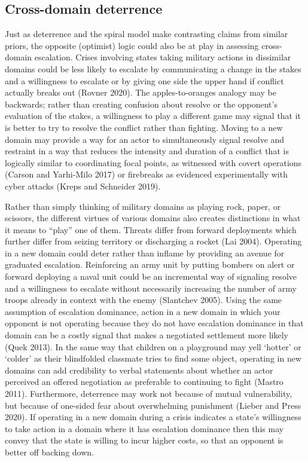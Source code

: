 \documentclass[
]{article}
\begin{document}
\hypertarget{cross-domain-deterrence}{%
\subsection{Cross-domain deterrence}\label{cross-domain-deterrence}}

Just as deterrence and the spiral model make contrasting claims from similar priors, the opposite (optimist) logic could also be at play in assessing cross-domain escalation. Crises involving states taking military actions in dissimilar domains could be less likely to escalate by communicating a change in the stakes and a willingness to escalate or by giving one side the upper hand if conflict actually breaks out (Rovner 2020). The apples-to-oranges analogy may be backwards; rather than creating confusion about resolve or the opponent's evaluation of the stakes, a willingness to play a different game may signal that it is better to try to resolve the conflict rather than fighting. Moving to a new domain may provide a way for an actor to simultaneously signal resolve and restraint in a way that reduces the intensity and duration of a conflict that is logically similar to coordinating focal points, as witnessed with covert operations (Carson and Yarhi-Milo 2017) or firebreaks as evidenced experimentally with cyber attacks (Kreps and Schneider 2019).

Rather than simply thinking of military domains as playing rock, paper, or scissors, the different virtues of various domains also creates distinctions in what it means to ``play'' one of them. Threats differ from forward deployments which further differ from seizing territory or discharging a rocket (Lai 2004). Operating in a new domain could deter rather than inflame by providing an avenue for graduated escalation. Reinforcing an army unit by putting bombers on alert or forward deploying a naval unit could be an incremental way of signaling resolve and a willingness to escalate without necessarily increasing the number of army troops already in context with the enemy (Slantchev 2005). Using the same assumption of escalation dominance, action in a new domain in which your opponent is not operating because they do not have escalation dominance in that domain can be a costly signal that makes a negotiated settlement more likely (Quek 2013). In the same way that children on a playground may yell `hotter' or `colder' as their blindfolded classmate tries to find some object, operating in new domains can add credibility to verbal statements about whether an actor perceived an offered negotiation as preferable to continuing to fight (Mastro 2011). Furthermore, deterrence may work not because of mutual vulnerability, but because of one-sided fear about overwhelming punishment (Lieber and Press 2020). If operating in a new domain during a crisis indicates a state's willingness to take action in a domain where it has escalation dominance then this may convey that the state is willing to incur higher costs, so that an opponent is better off backing down.
\end{document}
